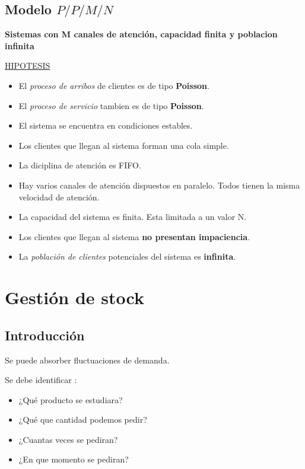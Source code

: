 \documentclass{article}
\begin{document}
\subsection{Modelo \(P/P/M/N\)}

\textbf{Sistemas con M canales de atención, capacidad finita y poblacion infinita}

\noindent
\underline{HIPOTESIS}
\begin{itemize}
    \item El \textit{proceso de arribos} de clientes es de tipo \textbf{Poisson}.
    \item El \textit{proceso de servicio} tambien es de tipo \textbf{Poisson}.
    \item El sistema se encuentra en condiciones estables.
    \item Los clientes que llegan al sistema forman una cola simple.
    \item La diciplina de atención es FIFO.
    \item Hay varios canales de atención dispuestos en paralelo. Todos tienen la misma velocidad de atención.
    \item La capacidad del sistema es finita. Esta limitada a un valor N.
    \item Los clientes que llegan al sistema \textbf{no presentan impaciencia}.
    \item La \textit{población de clientes} potenciales del sistema es \textbf{infinita}.
\end{itemize}

\newpage
\section{Gestión de stock}

\subsection{Introducción}

Se puede absorber fluctuaciones de demanda.

Se debe identificar :
\begin{itemize}
    \item ¿Qué producto se estudiara?
    \item ¿Qué que cantidad podemos pedir?
    \item ¿Cuantas veces se pediran?
    \item ¿En que momento se pediran?
\end{itemize}
\end{document}
